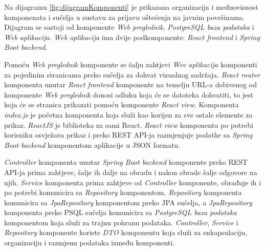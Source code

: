 			Na dijagramu \ref{fig:dijagramKomponenti} je prikazana organizacija i međuovisnost komponenata i sučelja u sustavu za prijavu oštećenja na javnim površinama. Dijagram se sastoji od komponente \textit{Web preglednik}, \textit{PostgreSQL baza podataka} i \textit{Web aplikacija}. \textit{Web aplikacija} ima dvije podkomponente: \textit{React frontend} i \textit{Spring Boot backend}. 
			
			Pomoću \textit{Web preglednik} komponente se šalju zahtjevi \textit{Wev aplikacija} komponenti za pojedinim stranicama preko sučelja za dohvat vizualnog sadržaja. \textit{React router} komponenta unutar \textit{React frontend} komponente na temelju URL-a dobivenog od komponente \textit{Web preglednik} donosi odluku koja će se datoteka dohvatiti, to jest koja će se stranica prikazati pomoću komponente \textit{React view}. Komponenta \textit{index.js} je početna komponenta koja služi kao korijen za sve ostale elemente za prikaz. \textit{ReactJS} je biblioteka za sami React. \textit{React view} komponenta po potrebi korisniku osvježava prikaz i preko REST API-ja razmjenjuje podatke sa \textit{Spring Boot backend} komponentom aplikacije u JSON formatu.
			
			\textit{Controller} komponenta unutar \textit{Spring Boot backend} komponente preko REST API-ja prima zahtjeve, šalje ih dalje na obradu i nakon obrade šalje odgovore na njih. \textit{Service} komponenta prima zahtjeve od \textit{Controller} komponente, obrađuje ih i po potrebi komunicira sa \textit{Repository} komponentom. \textit{Repository} komponenta komunicira sa \textit{JpaRepository} komponentom preko JPA sučelja, a \textit{JpaRepository} komponenta preko PSQL sučelja komunicira sa \textit{PostgreSQL baza podataka} komponentom koja služi za trajnu pohranu podataka. \textit{Controller}, \textit{Service} i \textit{Repository} komponente koriste \textit{DTO} komponentu koja služi za enkapsulaciju, organizaciju i razmjenu podataka između komponenti.
			
